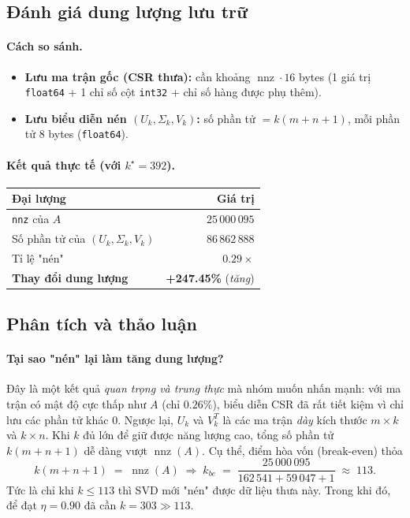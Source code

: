 \subsection{Đánh giá dung lượng lưu trữ}

\paragraph{Cách so sánh.}
\begin{itemize}
    \item \textbf{Lưu ma trận gốc (CSR thưa):}
    cần khoảng $\operatorname{nnz} \cdot 16$ bytes
    (1 giá trị \texttt{float64} + 1 chỉ số cột \texttt{int32} + chỉ số hàng
    được phụ thêm).
    \item \textbf{Lưu biểu diễn nén $(U_k, \Sigma_k, V_k)$:}
    số phần tử $= k(m+n+1)$, mỗi phần tử $8$ bytes (\texttt{float64}).
\end{itemize}

\paragraph{Kết quả thực tế (với $k^\star=392$).}
\begin{center}
\begin{tabular}{|l|r|}
\hline
\textbf{Đại lượng} & \textbf{Giá trị} \\
\hline
\texttt{nnz} của $A$                 & $25\,000\,095$ \\
Số phần tử của $(U_k,\Sigma_k,V_k)$  & $86\,862\,888$ \\
Tỉ lệ "nén"                          & $0.29\times$ \\
\textbf{Thay đổi dung lượng}         & \textbf{+247.45\%} (\emph{tăng}) \\
\hline
\end{tabular}
\end{center}

\subsection{Phân tích và thảo luận}

\paragraph{Tại sao "nén" lại làm tăng dung lượng?}
Đây là một kết quả \emph{quan trọng và trung thực} mà nhóm muốn nhấn mạnh: với
ma trận có mật độ cực thấp như $A$ (chỉ $0.26\%$), biểu diễn CSR đã rất tiết
kiệm vì chỉ lưu các phần tử khác $0$. Ngược lại, $U_k$ và $V_k^T$ là các ma
trận \emph{dày} kích thước $m \times k$ và $k\times n$. Khi $k$ đủ lớn để giữ
được năng lượng cao, tổng số phần tử $k(m+n+1)$ dễ dàng vượt $\operatorname{nnz}(A)$.
Cụ thể, điểm hòa vốn (break-even) thỏa
\[
k(m+n+1) \;=\; \operatorname{nnz}(A) \;\Longrightarrow\;
k_{be} \;=\; \frac{25\,000\,095}{162\,541+59\,047+1} \;\approx\; 113.
\]
Tức là chỉ khi $k \le 113$ thì SVD mới "nén" được dữ liệu thưa này. Trong khi
đó, để đạt $\eta=0.90$ đã cần $k=303 \gg 113$.

